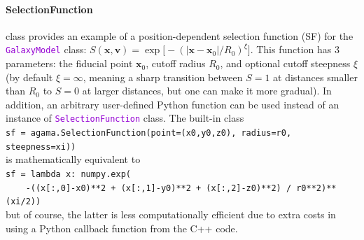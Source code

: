 \documentclass[12pt]{article}
\newcommand{\ttt}[1]{\textcolor{darkviolet}{\texttt{#1}}}
\newcommand{\bv}{\boldsymbol{v}}
\newcommand{\bx}{\boldsymbol{x}}
\let\oldparagraph\paragraph
\renewcommand{\paragraph}[1]{\vspace{-2mm}\oldparagraph{#1}}
\begin{document}
\paragraph{SelectionFunction} class provides an example of a position-dependent selection function (SF) for the \ttt{GalaxyModel} class: $S(\bx, \bv) = \exp\big[-(|\bx-\bx_0|/R_0)^\xi\big]$. This function has 3 parameters: the fiducial point $\bx_0$, cutoff radius $R_0$, and optional cutoff steepness $\xi$ (by default $\xi=\infty$, meaning a sharp transition between $S=1$ at distances smaller than $R_0$ to $S=0$ at larger distances, but one can make it more gradual). In addition, an arbitrary user-defined Python function can be used instead of an instance of \ttt{SelectionFunction} class. The built-in class\\
\texttt{sf = agama.SelectionFunction(point=(x0,y0,z0), radius=r0, steepness=xi))}\\
is mathematically equivalent to\\
\texttt{sf = lambda x: numpy.exp( \\
\mbox{}~~~~-((x[:,0]-x0)**2 + (x[:,1]-y0)**2 + (x[:,2]-z0)**2) / r0**2)**(xi/2))}\\
but of course, the latter is less computationally efficient due to extra costs in using a Python callback function from the C++ code.
\end{document}
